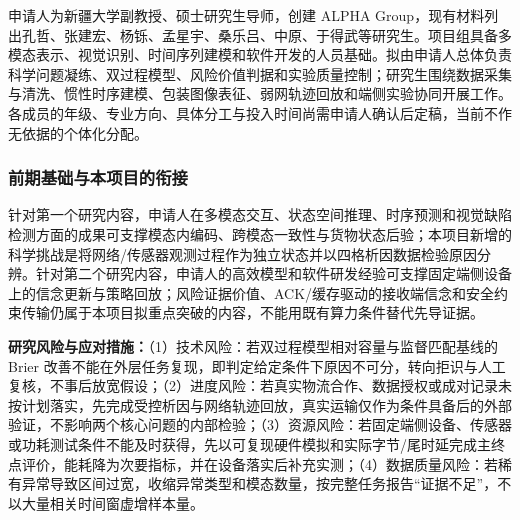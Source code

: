 申请人为新疆大学副教授、硕士研究生导师，创建 ALPHA Group，现有材料列出孔哲、张建宏、杨铄、孟星宇、桑乐吕、中原、于得武等研究生。项目组具备多模态表示、视觉识别、时间序列建模和软件开发的人员基础。拟由申请人总体负责科学问题凝练、双过程模型、风险价值判据和实验质量控制；研究生围绕数据采集与清洗、惯性时序建模、包装图像表征、弱网轨迹回放和端侧实验协同开展工作。各成员的年级、专业方向、具体分工与投入时间尚需申请人确认后定稿，当前不作无依据的个体化分配。

\subsubsection{前期基础与本项目的衔接}

针对第一个研究内容，申请人在多模态交互、状态空间推理、时序预测和视觉缺陷检测方面的成果可支撑模态内编码、跨模态一致性与货物状态后验；本项目新增的科学挑战是将网络/传感器观测过程作为独立状态并以四格析因数据检验原因分辨。针对第二个研究内容，申请人的高效模型和软件研发经验可支撑固定端侧设备上的信念更新与策略回放；风险证据价值、ACK/缓存驱动的接收端信念和安全约束传输仍属于本项目拟重点突破的内容，不能用既有算力条件替代先导证据。

\textbf{研究风险与应对措施：}（1）技术风险：若双过程模型相对容量与监督匹配基线的 Brier 改善不能在外层任务复现，即判定给定条件下原因不可分，转向拒识与人工复核，不事后放宽假设；（2）进度风险：若真实物流合作、数据授权或成对记录未按计划落实，先完成受控析因与网络轨迹回放，真实运输仅作为条件具备后的外部验证，不影响两个核心问题的内部检验；（3）资源风险：若固定端侧设备、传感器或功耗测试条件不能及时获得，先以可复现硬件模拟和实际字节/尾时延完成主终点评价，能耗降为次要指标，并在设备落实后补充实测；（4）数据质量风险：若稀有异常导致区间过宽，收缩异常类型和模态数量，按完整任务报告“证据不足”，不以大量相关时间窗虚增样本量。
